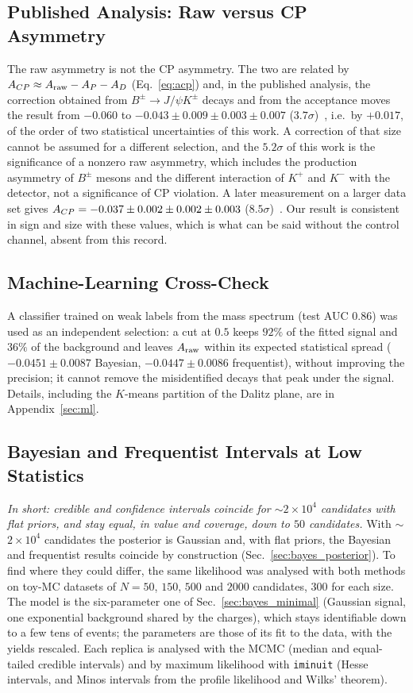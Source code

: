 \subsection{Published Analysis: Raw versus CP Asymmetry}
The raw asymmetry is not the CP asymmetry. The two are related by $A_{CP}\approx A_{\mathrm{raw}}-A_P-A_D$ (Eq.~\eqref{eq:acp}) and, in the published analysis, the correction obtained from $B^\pm\to J/\psi K^\pm$ decays and from the acceptance moves the result from $-0.060$ to $-0.043\pm0.009\pm0.003\pm0.007$ ($3.7\sigma$)~\cite{lhcb_cpv_2013}, i.e.\ by $+0.017$, of the order of two statistical uncertainties of this work. A correction of that size cannot be assumed for a different selection, and the $5.2\sigma$ of this work is the significance of a nonzero raw asymmetry, which includes the production asymmetry of $B^\pm$ mesons and the different interaction of $K^+$ and $K^-$ with the detector, not a significance of CP violation. A later measurement on a larger data set gives $A_{CP}=-0.037\pm0.002\pm0.002\pm0.003$ ($8.5\sigma$)~\cite{lhcb_cpv_prd2023,lhcb_cpv_paper}. Our result is consistent in sign and size with these values, which is what can be said without the control channel, absent from this record.

\subsection{Machine-Learning Cross-Check}
A classifier trained on weak labels from the mass spectrum (test AUC $0.86$) was used as an independent selection: a cut at $0.5$ keeps $92\%$ of the fitted signal and $36\%$ of the background and leaves $A_{\mathrm{raw}}$ within its expected statistical spread ($-0.0451\pm0.0087$ Bayesian, $-0.0447\pm0.0086$ frequentist), without improving the precision; it cannot remove the misidentified decays that peak under the signal. Details, including the $K$-means partition of the Dalitz plane, are in Appendix~\ref{sec:ml}.

\subsection{Bayesian and Frequentist Intervals at Low Statistics}
\label{sec:bayes_lowstat}
\emph{In short: credible and confidence intervals coincide for $\sim2\times10^4$ candidates with flat priors, and stay equal, in value and coverage, down to $50$ candidates.}
With $\sim$$2\times10^4$ candidates the posterior is Gaussian and, with flat priors, the Bayesian and frequentist results coincide by construction (Sec.~\ref{sec:bayes_posterior}). To find where they could differ, the same likelihood was analysed with both methods on toy-MC datasets of $N=50$, $150$, $500$ and $2000$ candidates, $300$ for each size. The model is the six-parameter one of Sec.~\ref{sec:bayes_minimal} (Gaussian signal, one exponential background shared by the charges), which stays identifiable down to a few tens of events; the parameters are those of its fit to the data, with the yields rescaled. Each replica is analysed with the MCMC (median and equal-tailed credible intervals) and by maximum likelihood with \texttt{iminuit} (Hesse intervals, and Minos intervals from the profile likelihood and Wilks' theorem).

